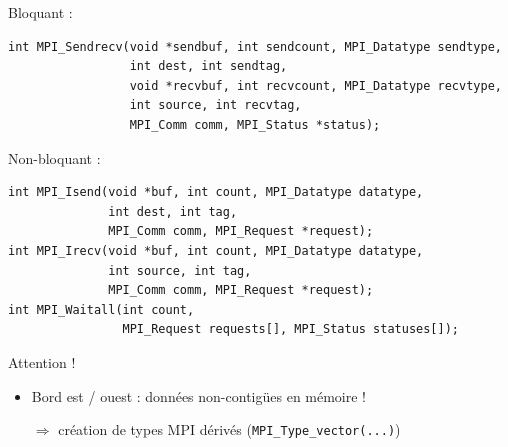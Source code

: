 \documentclass[xcolor={x11names,svgnames}]{beamer}
\begin{document}

\begin{frame}[fragile]

Bloquant :
\begin{verbatim}
int MPI_Sendrecv(void *sendbuf, int sendcount, MPI_Datatype sendtype, 
                 int dest, int sendtag, 
                 void *recvbuf, int recvcount, MPI_Datatype recvtype, 
                 int source, int recvtag, 
                 MPI_Comm comm, MPI_Status *status);
\end{verbatim}

Non-bloquant :
\begin{verbatim}
int MPI_Isend(void *buf, int count, MPI_Datatype datatype, 
              int dest, int tag, 
              MPI_Comm comm, MPI_Request *request);
int MPI_Irecv(void *buf, int count, MPI_Datatype datatype,
              int source, int tag, 
              MPI_Comm comm, MPI_Request *request);
int MPI_Waitall(int count, 
                MPI_Request requests[], MPI_Status statuses[]);
\end{verbatim}

\begin{alertblock}{Attention !}
  \begin{itemize}    
  \item Bord est / ouest : données \alert{non-contigües} en mémoire !
    \item[$\Rightarrow$] création de \alert{types MPI dérivés} (\texttt{MPI_Type_vector(...)})
  \end{itemize}
\end{alertblock}
\end{frame}

\end{document}
